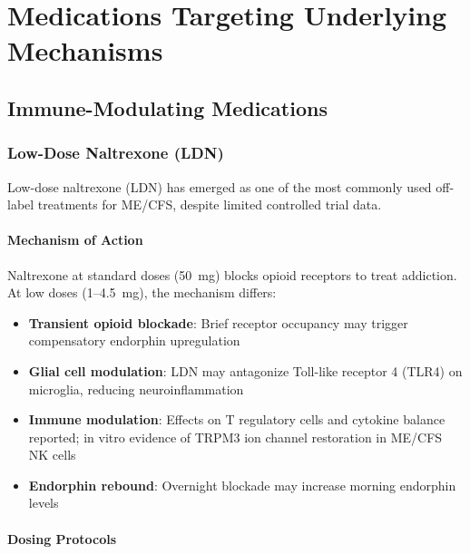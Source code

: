 \chapter{Medications Targeting Underlying Mechanisms}
\label{ch:medications-mechanisms}

\section{Immune-Modulating Medications}
\label{sec:immune-medications}

\subsection{Low-Dose Naltrexone (LDN)}

Low-dose naltrexone (LDN) has emerged as one of the most commonly used off-label treatments for ME/CFS, despite limited controlled trial data.

\subsubsection{Mechanism of Action}

Naltrexone at standard doses (50~mg) blocks opioid receptors to treat addiction. At low doses (1--4.5~mg), the mechanism differs:
\begin{itemize}
    \item \textbf{Transient opioid blockade}: Brief receptor occupancy may trigger compensatory endorphin upregulation~\cite{Younger2013}
    \item \textbf{Glial cell modulation}: LDN may antagonize Toll-like receptor 4 (TLR4) on microglia, reducing neuroinflammation~\cite{Younger2013}
    \item \textbf{Immune modulation}: Effects on T regulatory cells and cytokine balance reported; in vitro evidence of TRPM3 ion channel restoration in ME/CFS NK cells~\cite{Cabanas2021}
    \item \textbf{Endorphin rebound}: Overnight blockade may increase morning endorphin levels~\cite{Younger2013}
\end{itemize}

\subsubsection{Dosing Protocols}


